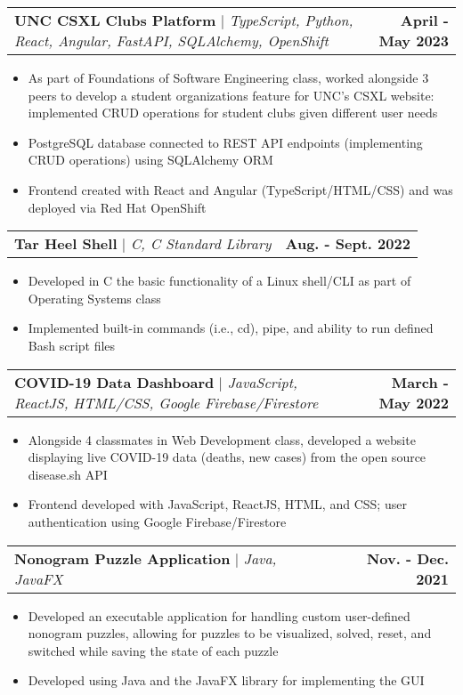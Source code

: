 \documentclass[letterpaper,11pt]{article}
\makeatletter
\newcommand{\resumeItem}[1]{
  \item\small{
    {#1 \vspace{-3pt}}
  }
}
\newcommand{\resumeProjectHeading}[2]{
    \item
    \begin{tabular*}{1.001\textwidth}{l@{\extracolsep{\fill}}r}
      \small#1 & \textbf{\small #2}\\
    \end{tabular*}\vspace{-7pt}
}
\newcommand{\resumeItemListStart}{\begin{itemize}}
\newcommand{\resumeItemListEnd}{\end{itemize}\vspace{-5pt}}
\makeatother
\begin{document}
        \resumeProjectHeading
          {\textbf{UNC CSXL Clubs Platform} $|$ \emph{TypeScript, Python, React, Angular, FastAPI, SQLAlchemy, OpenShift}}{April - May 2023}
          \resumeItemListStart
            \resumeItem{As part of Foundations of Software Engineering class, worked alongside 3 peers to develop a student organizations feature for UNC's CSXL website: implemented CRUD operations for student clubs given different user needs}
            \resumeItem{PostgreSQL database connected to REST API endpoints (implementing CRUD operations) using SQLAlchemy ORM}
            \vspace{-12pt}
            \resumeItem{Frontend created with React and Angular (TypeScript/HTML/CSS) and was deployed via Red Hat OpenShift}
          \resumeItemListEnd
          \vspace{-13pt}

        \resumeProjectHeading
          {\textbf{Tar Heel Shell} $|$ \emph{C, C Standard Library}}{Aug. - Sept. 2022}
          \resumeItemListStart
            \resumeItem{Developed in C the basic functionality of a Linux shell/CLI as part of Operating Systems class}
            \resumeItem{Implemented built-in commands (i.e., cd), pipe, and ability to run defined Bash script files}
          \resumeItemListEnd
          \vspace{-13pt}

        \resumeProjectHeading
          {\textbf{COVID-19 Data Dashboard} $|$ \emph{JavaScript, ReactJS, HTML/CSS, Google Firebase/Firestore}}{March - May 2022}
          \resumeItemListStart
            \resumeItem{Alongside 4 classmates in Web Development class, developed a website displaying live COVID-19 data (deaths, new cases) from the open source disease.sh API}
            \resumeItem{Frontend developed with JavaScript, ReactJS, HTML, and CSS; user authentication using Google Firebase/Firestore}
          \resumeItemListEnd
          \vspace{-13pt}

        \resumeProjectHeading
          {\textbf{Nonogram Puzzle Application} $|$ \emph{Java, JavaFX}}{Nov. - Dec. 2021}
          \resumeItemListStart
            \resumeItem{Developed an executable application for handling custom user-defined nonogram puzzles, allowing for puzzles to be visualized, solved, reset, and switched while saving the state of each puzzle}
            \resumeItem{Developed using Java and the JavaFX library for implementing the GUI}
          \resumeItemListEnd
          \vspace{-13pt}
\end{document}
